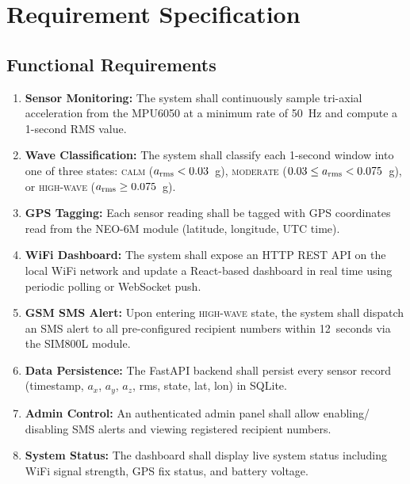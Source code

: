 
\chapter{Requirement Specification}
\label{chap:requirements}

\section{Functional Requirements}

\begin{enumerate}[label=FR-\arabic*.]
  \item \textbf{Sensor Monitoring:} The system shall continuously sample tri-axial
        acceleration from the MPU6050 at a minimum rate of 50~Hz and compute a
        1-second RMS value.
  \item \textbf{Wave Classification:} The system shall classify each 1-second window
        into one of three states: \textsc{calm} ($a_{\rm rms} < 0.03$~g),
        \textsc{moderate} ($0.03 \leq a_{\rm rms} < 0.075$~g), or
        \textsc{high-wave} ($a_{\rm rms} \geq 0.075$~g).
  \item \textbf{GPS Tagging:} Each sensor reading shall be tagged with GPS
        coordinates read from the NEO-6M module (latitude, longitude, UTC time).
  \item \textbf{WiFi Dashboard:} The system shall expose an HTTP REST API on the
        local WiFi network and update a React-based dashboard in real time using
        periodic polling or WebSocket push.
  \item \textbf{GSM SMS Alert:} Upon entering \textsc{high-wave} state, the system
        shall dispatch an SMS alert to all pre-configured recipient numbers within
        12~seconds via the SIM800L module.
  \item \textbf{Data Persistence:} The FastAPI backend shall persist every sensor
        record (timestamp, $a_x$, $a_y$, $a_z$, rms, state, lat, lon) in SQLite.
  \item \textbf{Admin Control:} An authenticated admin panel shall allow enabling/
        disabling SMS alerts and viewing registered recipient numbers.
  \item \textbf{System Status:} The dashboard shall display live system status
        including WiFi signal strength, GPS fix status, and battery voltage.
\end{enumerate}

